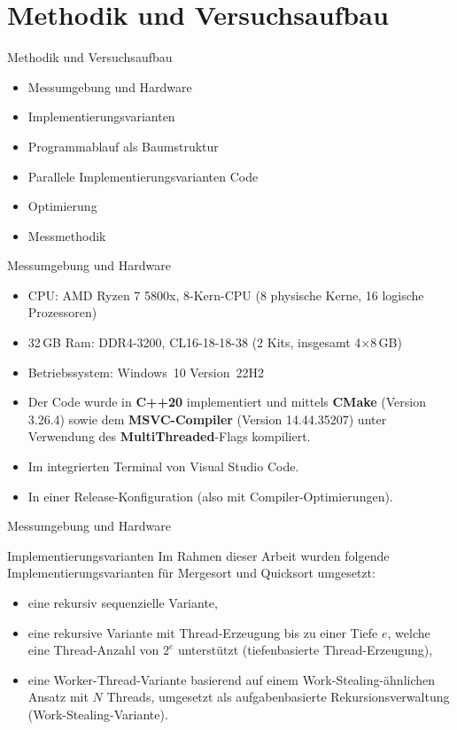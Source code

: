 \documentclass[10pt, ngerman]{beamer}
\begin{document}
\section{Methodik und Versuchsaufbau}
\begin{frame}{Methodik und Versuchsaufbau}
    \begin{itemize}
        \item Messumgebung und Hardware
        \item Implementierungsvarianten
        \item Programmablauf als Baumstruktur
        \item Parallele Implementierungsvarianten Code
        \item Optimierung
        \item Messmethodik
    \end{itemize}
\end{frame}

\begin{frame}{Messumgebung und Hardware}
    \begin{itemize}
        \item CPU: AMD Ryzen 7 5800x, 8-Kern-CPU (8 physische Kerne, 16 logische Prozessoren)
        \item 32\,GB Ram: DDR4-3200, CL16-18-18-38 (2 Kits, insgesamt 4×8\,GB)
        \item Betriebssystem: Windows~10 Version~22H2
        \item Der Code wurde in \textbf{C++20} implementiert und mittels \textbf{CMake} (Version 3.26.4) sowie dem \textbf{MSVC-Compiler} (Version 14.44.35207) unter Verwendung des \textbf{MultiThreaded}-Flags kompiliert.
        \item Im integrierten Terminal von Visual Studio Code.
        \item In einer Release-Konfiguration (also mit Compiler-Optimierungen).
    \end{itemize}
\end{frame}

\begin{frame}{Messumgebung und Hardware}
    \MessumgebungUndHardware
\end{frame}

\begin{frame}{Implementierungsvarianten}
    Im Rahmen dieser Arbeit wurden folgende Implementierungsvarianten für Mergesort und Quicksort umgesetzt:
    \begin{itemize}
        \item eine rekursiv sequenzielle Variante,
        \item eine rekursive Variante mit Thread-Erzeugung bis zu einer Tiefe $e$, welche eine Thread-Anzahl von $2^e$ unterstützt (tiefenbasierte Thread-Erzeugung),
        \item eine Worker-Thread-Variante basierend auf einem Work-Stealing-ähnlichen Ansatz mit $N$ Threads, umgesetzt als aufgabenbasierte Rekursionsverwaltung (Work-Stealing-Variante).
    \end{itemize}
\end{frame}
\end{document}
